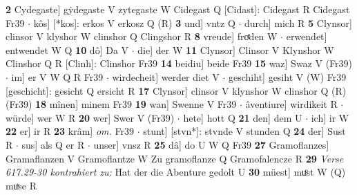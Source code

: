 \documentclass[8pt,a4paper,notitlepage]{article}
\begin{document}
\begin{table}[ht]
\begin{minipage}[t]{0.5\linewidth}
\textbf{2} Cydegaste] gẏdegaste V zytegaste W Cidegast Q [Cidast]: Cidegast R Cidegast Fr39  $\cdot$ kôs] [*kos]: erkos V erkosz Q (R) \textbf{3} und] vntz Q  $\cdot$ durch] mich R \textbf{5} Clynsor] clinsor V klyshor W clinshor Q Clingshor R \textbf{8} vreude] froͤden W  $\cdot$ erwendet] entwendet W Q \textbf{10} dô] Da V  $\cdot$ die] der W \textbf{11} Clynsor] Clinsor V Klynshor W Clinshor Q R [Clinh]: Clinshor Fr39 \textbf{14} beidiu] beide Fr39 \textbf{15} waz] Swaz V (Fr39)  $\cdot$ im] er V W Q R Fr39  $\cdot$ wirdecheit] werder diet V  $\cdot$ geschiht] gesiht V (W) Fr39 [geschicht]: gesicht Q ersicht R \textbf{17} Clynsor] clinsor V klynshor W clinshor Q (R) (Fr39) \textbf{18} mînen] minem Fr39 \textbf{19} wan] Swenne V Fr39  $\cdot$ âventiure] wirdikeit R  $\cdot$ würde] wer W R \textbf{20} wer] Swer V (Fr39)  $\cdot$ hete] hott Q \textbf{21} den] dem U  $\cdot$ ich] ir W \textbf{22} er] ir R \textbf{23} krâm] \textit{om.} Fr39  $\cdot$ stunt] [stvn*]: stvnde V stunden Q \textbf{24} der] Sust R  $\cdot$ sus] als Q er R  $\cdot$ unser] vnsz R \textbf{25} dâ] do U W Q Fr39 \textbf{27} Gramoflanzes] Gramaflanzen V Gramoflantze W Zu gramoflanze Q Gramofalencze R \textbf{29} \textit{Verse 617.29-30 kontrahiert zu:} Hat der die Abenture gedolt U  \textbf{30} müest] muͦst W (Q) muͯse R \newline
\end{minipage}
\end{table}
\end{document}
